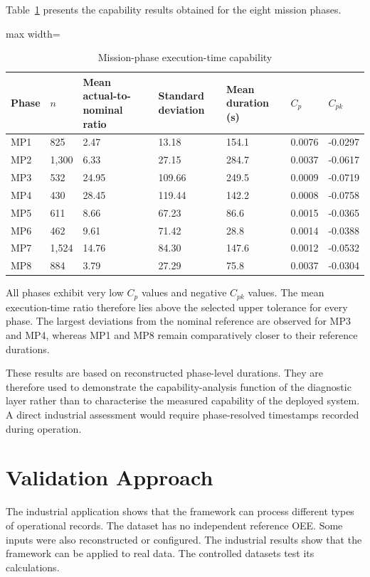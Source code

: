 Table~\ref{tab:mission-phase-execution-time-capability} presents the capability results obtained for the eight mission phases.

\begin{table}[htbp]
\small
\renewcommand{\arraystretch}{1.3}
\centering
\caption{Mission-phase execution-time capability}
\label{tab:mission-phase-execution-time-capability}
\begin{adjustbox}{max width=\textwidth}
\begin{tabular}{|p{1.0cm}|p{1.2cm}|p{2.9cm}|p{2.1cm}|p{2.0cm}|p{1.2cm}|p{1.2cm}|}
\hline
\textbf{Phase} & \textbf{$n$} & \textbf{Mean actual-to-nominal ratio} & \textbf{Standard deviation} & \textbf{Mean duration (s)} & \textbf{$C_p$} & \textbf{$C_{pk}$} \\
\hline
MP1 & 825 & 2.47 & 13.18 & 154.1 & 0.0076 & -0.0297 \\
\hline
MP2 & 1,300 & 6.33 & 27.15 & 284.7 & 0.0037 & -0.0617 \\
\hline
MP3 & 532 & 24.95 & 109.66 & 249.5 & 0.0009 & -0.0719 \\
\hline
MP4 & 430 & 28.45 & 119.44 & 142.2 & 0.0008 & -0.0758 \\
\hline
MP5 & 611 & 8.66 & 67.23 & 86.6 & 0.0015 & -0.0365 \\
\hline
MP6 & 462 & 9.61 & 71.42 & 28.8 & 0.0014 & -0.0388 \\
\hline
MP7 & 1,524 & 14.76 & 84.30 & 147.6 & 0.0012 & -0.0532 \\
\hline
MP8 & 884 & 3.79 & 27.29 & 75.8 & 0.0037 & -0.0304 \\
\hline
\end{tabular}
\end{adjustbox}
\end{table}

All phases exhibit very low $C_p$ values and negative $C_{pk}$ values. The mean execution-time ratio therefore lies above the selected upper tolerance for every phase. The largest deviations from the nominal reference are observed for MP3 and MP4, whereas MP1 and MP8 remain comparatively closer to their reference durations.

These results are based on reconstructed phase-level durations. They are therefore used to demonstrate the capability-analysis function of the diagnostic layer rather than to characterise the measured capability of the deployed system. A direct industrial assessment would require phase-resolved timestamps recorded during operation.
\section{Validation Approach}
The industrial application shows that the framework can process different types of operational records. The dataset has no independent reference OEE. Some inputs were also reconstructed or configured. The industrial results show that the framework can be applied to real data. The controlled datasets test its calculations.

